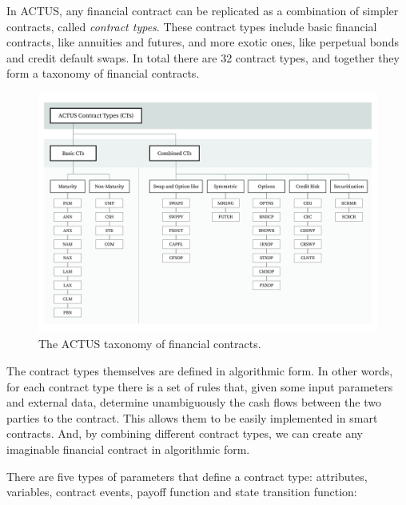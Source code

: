 \documentclass[conference]{IEEEtran}
\begin{document}
In ACTUS, any financial contract can be replicated as a combination of simpler contracts, called \textit{contract types}. These contract types include basic financial contracts, like annuities and futures, and more exotic ones, like perpetual bonds and credit default swaps. In total there are 32 contract types, and together they form a taxonomy of financial contracts.

\begin{figure}[t]
	\centering
	\includegraphics[width=\textwidth]{images/ACTUS.jpg}
	\caption{The ACTUS taxonomy of financial contracts.}
\end{figure}

The contract types themselves are defined in algorithmic form. In other words, for each contract type there is a set of rules that, given some input parameters and external data, determine unambiguously the cash flows between the two parties to the contract. This allows them to be easily implemented in smart contracts. And, by combining different contract types, we can create any imaginable financial contract in algorithmic form.

There are five types of parameters that define a contract type: attributes, variables, contract events, payoff function and state transition function:
\end{document}
